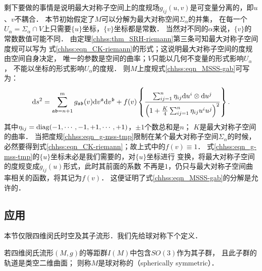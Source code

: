 剩下要做的事情是说明最大对称子空间上的度规场$g_{i j}(u, v)$是可变量分离的，即$u$、$v$不耦合．
本节初始假定了$M$可以分解为最大对称空间$\Sigma_\alpha$的并集，
在每一个$U_\alpha = \Sigma_\alpha \cap V$上只需要$\{u\}$坐标，$\{v\}$坐标都是常数．
当然对不同的$\alpha$来说，$\{v\}$的常数数值可能不同．
由定理\ref{chhss:thm_SRH-riemann}第三条可知最大对称子空间度规可以写为
式\eqref{chhss:eqn_CK-riemann}的形式；这说明最大对称子空间的度规由空间自身决定，
唯一的参数是空间的曲率；$V$只能以几何不变量的形式影响$U_\alpha$，
不能以坐标的形式影响$U_\alpha$的度规．
则$M$上度规式\eqref{chhss:eqn_MSSS-gab}可写为：
\begin{equation}\label{chhss:eqn_g-mss-tmp}
    \mathrm{d} s^2= \sum_{\mathfrak{ab}=n+1}^{m}
    g_{\mathfrak{ab}}(v) \mathrm{d} v^{\mathfrak{a}} \mathrm{d} v^{\mathfrak{b}}
    +f(v)\left\{\frac{\sum_{ij=1}^{n} \eta_{ij} {\rm d}u^i \otimes {\rm d}u^j }
    {\left(1+\tfrac{K}{4} \sum_{ij=1}^{n}\eta_{ij}  u^i u^j\right)^2}\right\} .
\end{equation}
其中$\eta_{ij}={\rm diag}(-1,\cdots,-1,+1,\cdots,+1)$，$\pm 1$个数总和是$n$；
$K$是最大对称子空间的曲率．
当把度规\eqref{chhss:eqn_g-mss-tmp}限制在某个最大对称子空间$\Sigma_\alpha$的时候，
必然要得到式\eqref{chhss:eqn_CK-riemann}；故上式中的$f(v)\equiv 1$．
式\eqref{chhss:eqn_g-mss-tmp}的$\{u\}$坐标未必是我们需要的，对$\{u\}$坐标进行
变换，将最大对称子空间的度规变成$\tilde{g}_{i j}(u)$形式，此时其前面的系数
不再是$1$，仍只与最大对称子空间曲率相关的函数，将其记为$f(v)$．
这便证明了式\eqref{chhss:eqn_MSSS-gab}的分解是允许的．



\subsection{应用}

本节仅限四维闵氏时空及其子流形．我们先给球对称下个定义．


\begin{definition}\label{chhss:def_Spherical-Symmetry}
    若四维闵氏流形$(M,g)$的等距群$I(M)$中包含$SO(3)$作为其子群，
    且此子群的轨道是类空二维曲面；
    则称$M$是{\heiti 球对称的}（spherically symmetric）．
\end{definition}


